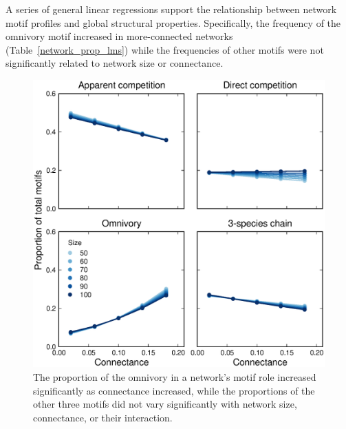 \documentclass[12pt]{article}
\begin{document}
\begin{spacing}{2.0}
        A series of general linear regressions support the relationship between network motif profiles and global structural properties.
        Specifically, the frequency of the omnivory motif increased in more-connected networks (Table~\ref{network_prop_lms}) while the frequencies of other motifs were not significantly related to network size or connectance.
    
    \begin{figure}[hb!]
        \centering
        \includegraphics[width=\textwidth]{figures/motif_proportion_lms.eps}
        \caption{The proportion of the omnivory in a network's motif role increased significantly as connectance increased, while the proportions of the other three motifs did not vary significantly with network size, connectance, or their interaction.}
        \label{motif_proportion_lms}
    \end{figure}    
    
    

\end{spacing}
\end{document}
